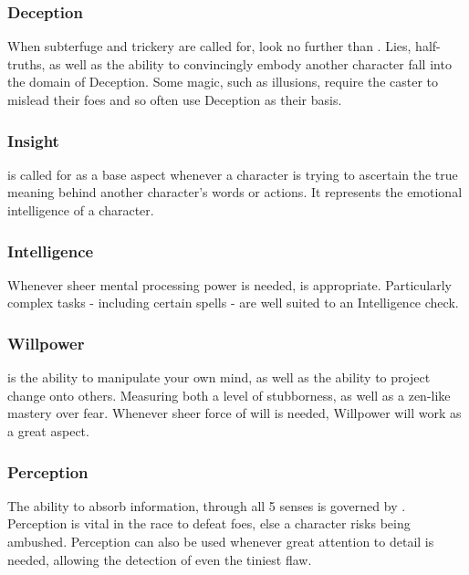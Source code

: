 \subsubsection{Deception}

When subterfuge and trickery are called for, look no further than . Lies, half-truths, as well as the ability to convincingly embody another character fall into the domain of {Deception}. Some magic, such as illusions, require the caster to mislead their foes and so often use Deception as their basis. 


\subsubsection{Insight}

 is called for as a base aspect whenever a character is trying to ascertain the true meaning behind another character's words or actions. It represents the emotional intelligence of a character. 


\subsubsection{Intelligence}

Whenever sheer mental processing power is needed,  is appropriate. Particularly complex tasks - including certain spells - are well suited to an Intelligence check.

\subsubsection{Willpower}

 is the ability to manipulate your own mind, as well as the ability to project change onto others. Measuring both a level of stubborness, as well as a zen-like mastery over fear. Whenever sheer force of will is needed, Willpower will work as a great aspect. 



\subsubsection{Perception}

The ability to absorb information, through all 5 senses is governed by . Perception is vital in the race to defeat foes, else a character risks being ambushed. Perception can also be used whenever great attention to detail is needed, allowing the detection of even the tiniest flaw.  


